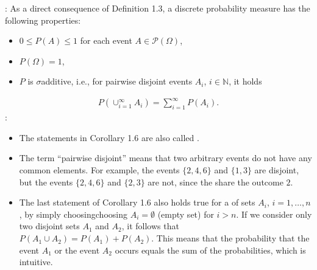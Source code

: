 \documentclass[letterpaper,10pt,english]{jupyterBook}
\begin{document}
\sphinxAtStartPar
{}: As a direct consequence of Definition 1.3, a discrete probability measure has the following properties:
\begin{itemize}
\item {} 
\sphinxAtStartPar
\(0 \le P(A) \le 1\) for each event \(A \in \mathcal{P}(\Omega)\),

\item {} 
\sphinxAtStartPar
\(P(\Omega) = 1\),

\item {} 
\sphinxAtStartPar
\(P\) is \(\sigma\)\sphinxhyphen{}additive, i.e., for pairwise disjoint events \(A_i\), \(i \in \mathbb{N}\), it holds

\end{itemize}
\begin{equation*}
\begin{split}P(\cup_{i=1}^{\infty} A_i) = \sum_{i=1}^{\infty} P(A_i).\end{split}
\end{equation*}
\sphinxAtStartPar
{}:
\begin{itemize}
\item {} 
\sphinxAtStartPar
The statements in Corollary 1.6 are also called .

\item {} 
\sphinxAtStartPar
The term “pairwise disjoint” means that two arbitrary events do not have any common elements. For example, the events \(\{2, 4, 6\}\) and \(\{1, 3\}\) are disjoint, but the events \(\{2, 4, 6\}\) and \(\{2, 3\}\) are not, since the share the outcome \(2\).

\item {} 
\sphinxAtStartPar
The last statement of Corollary 1.6 also holds true for a  of sets \(A_i\), \(i=1,\dots,n\), by simply choosingchoosing \(A_i = \emptyset\) (empty set) for \(i > n\). If we consider only two disjoint sets \(A_1\) and \(A_2\), it follows that \(P(A_1 \cup A_2) = P(A_1) + P(A_2)\). This means that the probability that the event \(A_1\) or the event \(A_2\) occurs equals the sum of the probabilities, which is intuitive.

\end{itemize}
\end{document}
